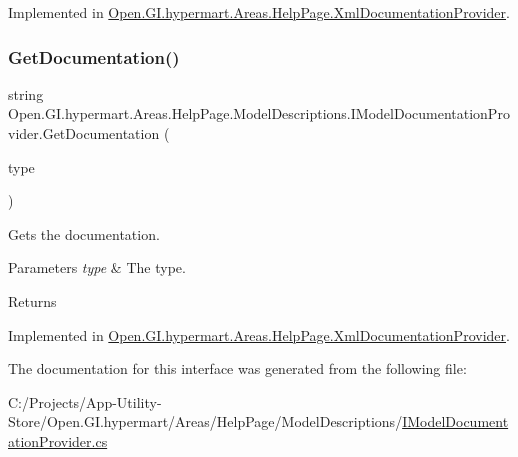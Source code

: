 Implemented in \hyperlink{class_open_1_1_g_i_1_1hypermart_1_1_areas_1_1_help_page_1_1_xml_documentation_provider_a1ba7e50dea71787a555f92306ec99efc}{Open.\+G\+I.\+hypermart.\+Areas.\+Help\+Page.\+Xml\+Documentation\+Provider}.

\hypertarget{interface_open_1_1_g_i_1_1hypermart_1_1_areas_1_1_help_page_1_1_model_descriptions_1_1_i_model_documentation_provider_a047061b90c62930fc0a1dbcb09732bd3}{}\label{interface_open_1_1_g_i_1_1hypermart_1_1_areas_1_1_help_page_1_1_model_descriptions_1_1_i_model_documentation_provider_a047061b90c62930fc0a1dbcb09732bd3} 
\subsubsection{\texorpdfstring{Get\+Documentation()}{GetDocumentation()}\hspace{0.1cm}{\footnotesize\ttfamily [2/2]}}
{\footnotesize\ttfamily string Open.\+G\+I.\+hypermart.\+Areas.\+Help\+Page.\+Model\+Descriptions.\+I\+Model\+Documentation\+Provider.\+Get\+Documentation (\begin{DoxyParamCaption}\item[{Type}]{type }\end{DoxyParamCaption})}



Gets the documentation. 


\begin{DoxyParams}{Parameters}
{\em type} & The type.\\
\hline
\end{DoxyParams}
\begin{DoxyReturn}{Returns}

\end{DoxyReturn}


Implemented in \hyperlink{class_open_1_1_g_i_1_1hypermart_1_1_areas_1_1_help_page_1_1_xml_documentation_provider_af096939cdb4e5a26bd20ae3341fad66c}{Open.\+G\+I.\+hypermart.\+Areas.\+Help\+Page.\+Xml\+Documentation\+Provider}.



The documentation for this interface was generated from the following file\+:\begin{DoxyCompactItemize}
\item 
C\+:/\+Projects/\+App-\/\+Utility-\/\+Store/\+Open.\+G\+I.\+hypermart/\+Areas/\+Help\+Page/\+Model\+Descriptions/\hyperlink{_i_model_documentation_provider_8cs}{I\+Model\+Documentation\+Provider.\+cs}\end{DoxyCompactItemize}
